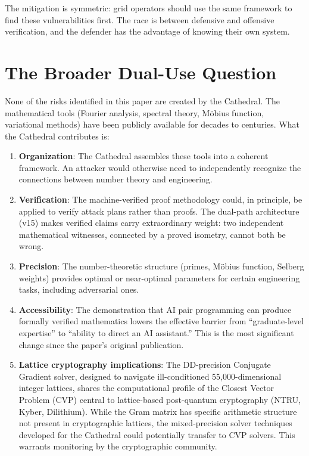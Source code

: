 \documentclass[11pt,a4paper]{article}
\begin{document}
The mitigation is symmetric: grid operators should use the same
framework to find these vulnerabilities first. The race is between
defensive and offensive verification, and the defender has the
advantage of knowing their own system.

\section{The Broader Dual-Use Question}

None of the risks identified in this paper are created by the
Cathedral. The mathematical tools (Fourier analysis, spectral
theory, M\"obius function, variational methods) have been publicly
available for decades to centuries. What the Cathedral contributes
is:

\begin{enumerate}
  \item \textbf{Organization}: The Cathedral assembles these tools
    into a coherent framework. An attacker would otherwise need to
    independently recognize the connections between number theory
    and engineering.
  \item \textbf{Verification}: The machine-verified proof
    methodology could, in principle, be applied to verify attack
    plans rather than proofs. The dual-path architecture (v15)
    makes verified claims carry extraordinary weight: two
    independent mathematical witnesses, connected by a proved
    isometry, cannot both be wrong.
  \item \textbf{Precision}: The number-theoretic structure (primes,
    M\"obius function, Selberg weights) provides optimal or
    near-optimal parameters for certain engineering tasks,
    including adversarial ones.
  \item \textbf{Accessibility}: The demonstration that AI pair
    programming can produce formally verified mathematics lowers
    the effective barrier from ``graduate-level expertise'' to
    ``ability to direct an AI assistant.'' This is the most
    significant change since the paper's original publication.
  \item \textbf{Lattice cryptography implications}: The DD-precision
    Conjugate Gradient solver, designed to navigate ill-conditioned
    55,000-dimensional integer lattices, shares the computational
    profile of the Closest Vector Problem (CVP) central to
    lattice-based post-quantum cryptography (NTRU, Kyber, Dilithium).
    While the Gram matrix has specific arithmetic structure not
    present in cryptographic lattices, the mixed-precision solver
    techniques developed for the Cathedral could potentially
    transfer to CVP solvers. This warrants monitoring by the
    cryptographic community.
\end{enumerate}
\end{document}
